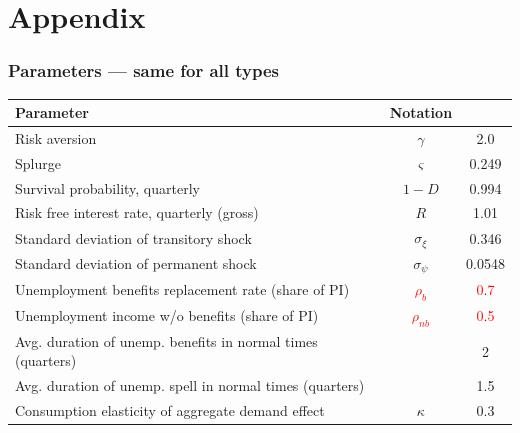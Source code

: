 \documentclass[pdflatex,aspectratio=169]{beamer}
\begin{document}
\section{Appendix}

\begin{frame}
\frametitle{Parameters --- same for all types}
\label{sli:paramsSame}
\begin{tabular}{lcc}
	\toprule
	Parameter & Notation & \text{Value} \\ \midrule 
	Risk aversion & $\gamma$ & 2.0 \\ 
	Splurge & $\varsigma$ & 0.249 \\ 
	Survival probability, quarterly & $1-D$ & 0.994 \\
	Risk free interest rate, quarterly (gross) & $R$ & 1.01 \\ 
	Standard deviation of transitory shock & $\sigma_\xi$ & 0.346 \\
	Standard deviation of permanent shock & $\sigma_\psi$ & 0.0548 \\ 
	Unemployment benefits replacement rate (share of PI) & \textcolor{red}{$\rho_b$} & \textcolor{red}{0}.\textcolor{red}{7} \\ 
	Unemployment income w/o benefits (share of PI) & \textcolor{red}{$\rho_{nb}$} & \textcolor{red}{0}.\textcolor{red}{5} \\ 
	Avg. duration of unemp. benefits in normal times (quarters) & & 2 \\
	Avg. duration of unemp. spell in normal times (quarters) & & 1.5 \\
	Consumption elasticity of aggregate demand effect & $\kappa$ & 0.3 
	\\ \bottomrule 
\end{tabular}

\vspace{.5cm}
\hyperlink{Parameters}{} 
\end{frame}
\end{document}

